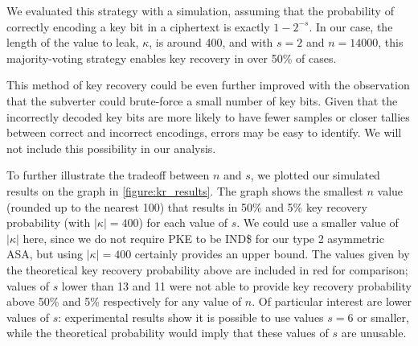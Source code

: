 \else
We evaluated this strategy with a simulation, assuming that the probability of correctly encoding a key bit in a ciphertext is exactly $1-2^{-s}$. In our case, the length of the value to leak, $\kappa$, is around 400, and with $s=2$ and $n=14000$, this majority-voting strategy enables key recovery in over 50\% of cases.
\fi

This method of key recovery could be even further improved with the observation that the subverter could brute-force a small number of key bits. Given that the incorrectly decoded key bits are more likely to have fewer samples or closer tallies between correct and incorrect encodings, errors may be easy to identify. We will not include this possibility in our analysis.

To further illustrate the tradeoff between $n$ and $s$, we plotted our simulated results on the graph in \autoref{figure:kr_results}. The graph shows the smallest $n$ value (rounded up to the nearest 100) that results in 50\% and 5\% key recovery probability (with $|\kappa|=400$) for each value of $s$. We could use a smaller value of $|\kappa|$ here, since we do not require \textsf{PKE} to be IND\$ for our type 2 asymmetric ASA, but using $|\kappa|=400$ certainly provides an upper bound. The values given by the theoretical key recovery probability above are included in red for comparison; values of $s$ lower than 13 and 11 were not able to provide key recovery probability above 50\% and 5\% respectively for any value of $n$. Of particular interest are lower values of $s$: experimental results show it is possible to use values $s=6$ or smaller, while the theoretical probability would imply that these values of $s$ are unusable.

